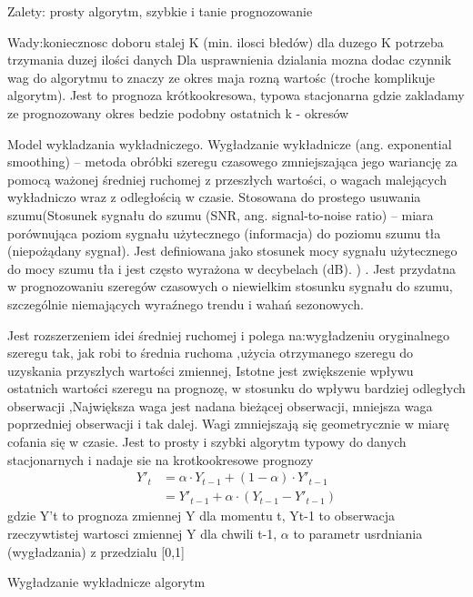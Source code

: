 Zalety: prosty algorytm, szybkie i tanie prognozowanie

Wady:koniecznosc doboru stalej K (min. ilosci błedów) dla duzego K potrzeba trzymania duzej ilości danych
Dla usprawnienia dzialania mozna dodac czynnik wag do algorytmu to znaczy ze okres maja rozną wartośc (troche komplikuje algorytm).
Jest to prognoza krótkookresowa, typowa stacjonarna  gdzie zakladamy ze prognozowany okres bedzie podobny ostatnich k - okresów\cite{szer2009}






Model wykladzania wykładniczego.
Wygładzanie wykładnicze (ang. exponential smoothing) – metoda obróbki szeregu czasowego zmniejszająca jego wariancję za pomocą ważonej średniej ruchomej z przeszłych wartości, o wagach malejących wykładniczo wraz z odległością w czasie. Stosowana do prostego usuwania szumu(Stosunek sygnału do szumu (SNR, ang. signal-to-noise ratio) – miara porównująca poziom sygnału użytecznego (informacja) do poziomu szumu tła (niepożądany sygnał). Jest definiowana jako stosunek mocy sygnału użytecznego do mocy szumu tła i jest często wyrażona w decybelach (dB). ) . Jest przydatna w prognozowaniu szeregów czasowych o niewielkim stosunku sygnału do szumu, szczególnie niemających wyraźnego trendu i wahań sezonowych. \cite{wyg2023}

Jest rozszerzeniem idei średniej ruchomej i polega na:wygładzeniu oryginalnego szeregu tak, jak robi to średnia ruchoma ,użycia otrzymanego szeregu do uzyskania przyszłych wartości 
zmiennej, Istotne jest zwiększenie wpływu ostatnich wartości szeregu na 
prognozę, w stosunku do wpływu bardziej odległych obserwacji ,Największa waga jest nadana bieżącej obserwacji, mniejsza waga poprzedniej obserwacji i tak dalej. Wagi zmniejszają się 
geometrycznie w miarę cofania się w czasie. Jest to prosty i szybki algorytm typowy do danych stacjonarnych i nadaje sie na krotkookresowe prognozy\cite{szer2009}
\begin{align*}
Y'_t & = \alpha \cdot Y_{t-1} + (1 - \alpha) \cdot Y'_{t-1} \\
& = Y'_{t-1} + \alpha \cdot (Y_{t-1} - Y'_{t-1})
\end{align*}
gdzie  Y't to prognoza zmiennej Y dla momentu t, Yt-1 to obserwacja rzeczywtistej wartosci zmiennej Y dla chwili t-1, \(\alpha\) to parametr usrdniania (wygładzania) z przedzialu [0,1]


 Wygładzanie wykładnicze algorytm\cite{szer2009}







